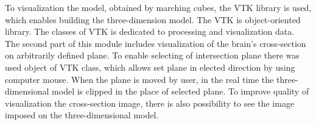 \indent To visualization the model, obtained by marching cubes, the
VTK library is used, which enables building the three-dimension model.
The VTK is object-oriented library. The classes of VTK is dedicated to processing and visualization data.
\\
 \indent The second part of this module includes visualization of the brain’s cross-section on arbitrarily defined plane. To enable selecting of intersection plane there was used object of VTK class, which allows set plane in elected direction by using computer mouse. When the plane is moved by user, in the real time the  three-dimensional model is clipped in the place of selected plane. To improve quality of visualization the cross-section image, there is also possibility to see the image imposed on the three-dimensional model. \\


